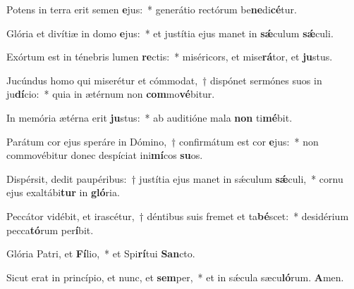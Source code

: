 \item Potens in terra erit semen \textbf{e}jus:~* generátio rectórum be\textbf{ne}di\textbf{cé}tur.
\item Glória et divítiæ in domo \textbf{e}jus:~* et justítia ejus manet in \textbf{sǽ}culum \textbf{sǽ}culi.
\item Exórtum est in ténebris lumen \textbf{re}ctis:~* miséricors, et mise\textbf{rá}tor, et \textbf{ju}stus.
\item Jucúndus homo qui miserétur et cómmodat,~† dispónet sermónes suos in ju\textbf{dí}cio:~* quia in ætérnum non \textbf{com}mo\textbf{vé}bitur.
\item In memória ætérna erit \textbf{ju}stus:~* ab auditióne mala \textbf{non} ti\textbf{mé}bit.
\item Parátum cor ejus speráre in Dómino,~† confirmátum est cor \textbf{e}jus:~* non commovébitur donec despíciat ini\textbf{mí}cos \textbf{su}os.
\item Dispérsit, dedit paupéribus:~† justítia ejus manet in sǽculum \textbf{sǽ}culi,~* cornu ejus exaltábi\textbf{tur} in \textbf{gló}ria.
\item Peccátor vidébit, et irascétur,~† déntibus suis fremet et ta\textbf{bé}scet:~* desidérium pecca\textbf{tó}rum per\textbf{í}bit.
\item Glória Patri, et \textbf{Fí}lio,~* et Spi\textbf{rí}tui \textbf{San}cto.
\item Sicut erat in princípio, et nunc, et \textbf{sem}per,~* et in sǽcula sæcu\textbf{ló}rum. \textbf{A}men.